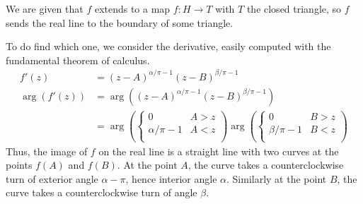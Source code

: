 \documentclass{homework}
\begin{document}
                                                                                                        \begin{solution}
                                                                                                        We are given that $f$ extends to a map $f:H\to T$ with $T$ the closed triangle, so $f$ sends the real line to the boundary of some triangle.

                                                                                                        To do find which one, we consider the derivative, easily computed with the fundamental theorem of calculus.
                                                                                                        \begin{align*}
                                                                                                        f'(z) &= (z - A)^{\alpha/\pi-1}(z - B)^{\beta/\pi-1}\\
                                                                                                        \arg(f'(z)) &= \arg((z - A)^{\alpha/\pi-1}(z - B)^{\beta/\pi-1})\\
                                                                                                        &= \arg\left(\begin{cases}
                                                                                                        0 & A > z \\
                                                                                                        \alpha/\pi - 1 & A < z \\
                                                                                                        \end{cases}
                                                                                                        \right)
                                                                                                        \arg\left(\begin{cases}
                                                                                                        0 & B > z \\
                                                                                                        \beta/\pi - 1 & B < z \\
                                                                                                        \end{cases}
                                                                                                        \right)
                                                                                                        \end{align*}
                                                                                                        Thus, the image of $f$ on the real line is a straight line with two curves at the points $f(A)$ and $f(B)$. At the point $A$, the curve takes a counterclockwise turn of exterior angle $\alpha - \pi$, hence interior angle $\alpha$. Similarly at the point $B$, the curve takes a counterclockwise turn of angle $\beta.$


\end{solution}
\end{document}
